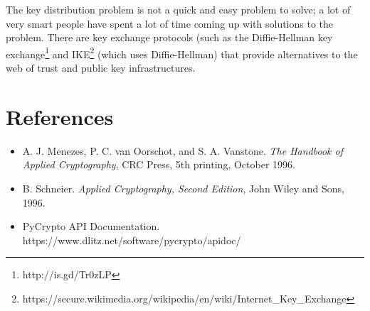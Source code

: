 \documentclass[letterpaper,10pt]{article}
\begin{document}
The key distribution problem is not a quick and easy problem to solve; a lot of
very smart people have spent a lot of time coming up with solutions to the
problem. There are key exchange protocols (such as the Diffie-Hellman key
exchange\footnote{http://is.gd/Tr0zLP}
and IKE\footnote{https://secure.wikimedia.org/wikipedia/en/wiki/Internet\_Key\_Exchange} 
(which uses Diffie-Hellman) that provide alternatives to the web of trust and
public key infrastructures.

\section{References}
\begin{itemize}
  \item A. J. Menezes, P. C. van Oorschot, and S. A. Vanstone. \textit{The Handbook of Applied Cryptography}, CRC Press, 5th printing, October 1996.

  \item B. Schneier. \textit{Applied Cryptography, Second Edition}, John Wiley and Sons, 1996.

  \item PyCrypto API Documentation. https://www.dlitz.net/software/pycrypto/apidoc/

\end{itemize}
\end{document}
